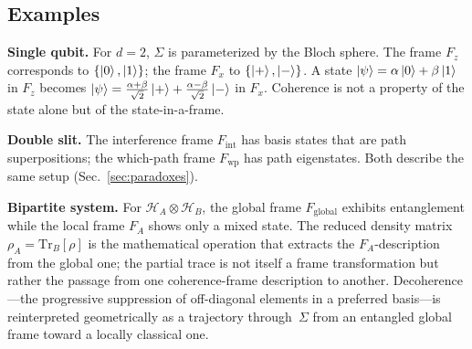\documentclass[aps,prd,twocolumn,superscriptaddress,nofootinbib,floatfix]{revtex4-2}
\newcommand{\Sig}{\Sigma}
\newcommand{\Fint}{F_{\mathrm{int}}}
\newcommand{\Fwp}{F_{\mathrm{wp}}}
\begin{document}
\subsection{Examples}

\textbf{Single qubit.} For $d=2$, $\Sig$ is parameterized by the Bloch sphere. The frame $F_z$ corresponds to $\{\ket{0}, \ket{1}\}$; the frame $F_x$ to $\{\ket{+}, \ket{-}\}$. A state $\ket{\psi} = \alpha\ket{0} + \beta\ket{1}$ in $F_z$ becomes $\ket{\psi} = \tfrac{\alpha+\beta}{\sqrt{2}}\ket{+} + \tfrac{\alpha-\beta}{\sqrt{2}}\ket{-}$ in $F_x$. Coherence is not a property of the state alone but of the state-in-a-frame.

\textbf{Double slit.} The interference frame $\Fint$ has basis states that are path superpositions; the which-path frame $\Fwp$ has path eigenstates. Both describe the same setup (Sec.~\ref{sec:paradoxes}).

\textbf{Bipartite system.} For $\mathcal{H}_A \otimes \mathcal{H}_B$, the global frame $F_{\mathrm{global}}$ exhibits entanglement while the local frame $F_A$ shows only a mixed state. The reduced density matrix $\rho_A = \mathrm{Tr}_B[\rho]$ is the mathematical operation that extracts the $F_A$-description from the global one; the partial trace is not itself a frame transformation but rather the passage from one coherence-frame description to another. Decoherence---the progressive suppression of off-diagonal elements in a preferred basis---is reinterpreted geometrically as a trajectory through~$\Sig$ from an entangled global frame toward a locally classical one.
\end{document}

